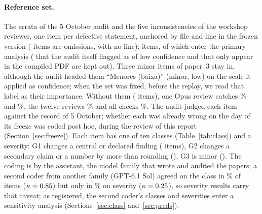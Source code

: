 \documentclass[11pt]{article}
\begin{document}
\paragraph{Reference set.} The errata of the 5 October audit and the five inconsistencies of the workshop reviewer, one item per
defective statement, anchored by file and line in the frozen version (\Nomission{} items are omissions, with no line): \NrefAll{} items, of which \NrefPrimary{} enter the primary
analysis (\NrefLowConf{} that the audit itself flagged as of low confidence and \NrefPdfOnly{} that only appear in the compiled PDF are
kept out). Three minor items of paper~3 stay in, although the audit headed them ``Menores (baixa)'' (minor, low) on the scale it
applied as confidence; when the set was fixed, before the replay, we read that label as their importance. Without them
(\NrefNoLowThree{} items), one Opus review catches \RecOpusANoLowPct\% and \RecOpusBNoLowPct\%, the twelve reviews
\RecConeNoLowPct\% and all checks \RecAllNoLowPct\%. The audit judged
each item against the record of 5 October; whether each was already wrong on the day of its freeze was coded post hoc, during the
review of this report (Section~\ref{sec:freeze}). Each item has one of ten
classes (Table~\ref{tab:class}) and a severity: G1 changes a central or declared finding (\NsevGOne{} items), G2 changes a
secondary claim or a number by more than rounding (\NsevGTwo), G3 is minor (\NsevGThree). The coding is by the assistant, the
model family that wrote and audited the papers; a second coder from another family (GPT-6.1 Sol) agreed on the class in
\AgreeClass\% of items ($\kappa=0.85$) but only in \AgreeSev\% on severity ($\kappa=0.25$), so severity results carry
that caveat; as registered, the second coder's classes and severities enter a sensitivity analysis (Sections~\ref{sec:class}
and~\ref{sec:preds}).
\end{document}
